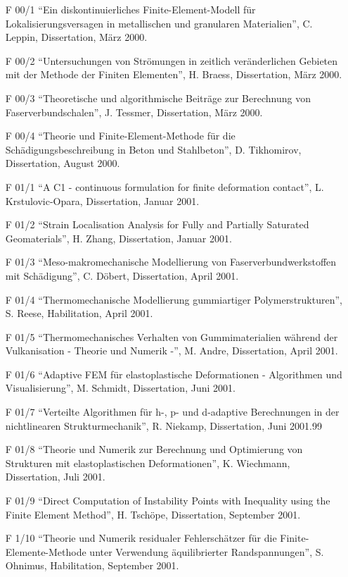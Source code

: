 \begin{itemize}
    \item[F 00/1] ``Ein diskontinuierliches Finite-Element-Modell für Lokalisierungsversagen in metallischen und granularen Materialien”, C. Leppin, Dissertation, März 2000.
    \item[F 00/2] ``Untersuchungen von Strömungen in zeitlich veränderlichen Gebieten mit der Methode der Finiten Elementen”, H. Braess, Dissertation, März 2000.
    \item[F 00/3] ``Theoretische und algorithmische Beiträge zur Berechnung von Faserverbundschalen”, J. Tessmer, Dissertation, März 2000.
    \item[F 00/4] ``Theorie und Finite-Element-Methode für die Schädigungsbeschreibung in Beton und Stahlbeton”, D. Tikhomirov, Dissertation, August 2000.
    \item[F 01/1] ``A C1 - continuous formulation for finite deformation contact”, L. Krstulovic-Opara, Dissertation, Januar 2001.
    \item[F 01/2] ``Strain Localisation Analysis for Fully and Partially Saturated Geomaterials”, H. Zhang, Dissertation, Januar 2001.
    \item[F 01/3] ``Meso-makromechanische Modellierung von Faserverbundwerkstoffen mit Schädigung”, C. Döbert, Dissertation, April 2001.
    \item[F 01/4] ``Thermomechanische Modellierung gummiartiger Polymerstrukturen”, S. Reese, Habilitation, April 2001.
    \item[F 01/5] ``Thermomechanisches Verhalten von Gummimaterialien während der Vulkanisation - Theorie und Numerik -”, M. Andre, Dissertation, April 2001.
    \item[F 01/6] ``Adaptive FEM für elastoplastische Deformationen - Algorithmen und Visualisierung”, M. Schmidt, Dissertation, Juni 2001.
    \item[F 01/7] ``Verteilte Algorithmen für h-, p- und d-adaptive Berechnungen in der nichtlinearen Strukturmechanik”, R. Niekamp, Dissertation, Juni 2001.99
    \item[F 01/8] ``Theorie und Numerik zur Berechnung und Optimierung von Strukturen mit elastoplastischen Deformationen”, K. Wiechmann, Dissertation, Juli 2001.
    \item[F 01/9] ``Direct Computation of Instability Points with Inequality using the Finite Element Method”, H. Tschöpe, Dissertation, September 2001.
    \item[F 1/10] ``Theorie und Numerik residualer Fehlerschätzer für die Finite- Elemente-Methode unter Verwendung äquilibrierter Randspannungen”, S. Ohnimus, Habilitation, September 2001.

\end{itemize}
